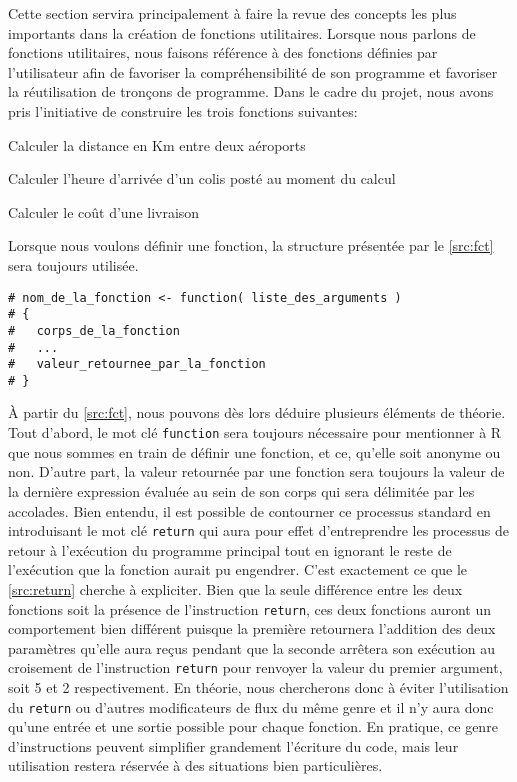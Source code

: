 Cette section servira principalement à faire la revue des concepts les plus importants dans la création de fonctions utilitaires. Lorsque nous parlons de fonctions utilitaires, nous faisons référence à des fonctions définies par l'utilisateur afin de favoriser la compréhensibilité de son programme et favoriser la réutilisation de tronçons de programme. Dans le cadre du projet, nous avons pris l'initiative de construire les trois fonctions suivantes: \\
\begin{description}[style=multiline,leftmargin=2.5cm]
	\item[airportsDist] Calculer la distance en Km entre deux aéroports
	\item[arrivalTime] Calculer l'heure d'arrivée d'un colis posté au moment du calcul
	\item[shippingCost] Calculer le coût d'une livraison
\end{description}

Lorsque nous voulons définir une fonction, la structure présentée par le \autoref{src:fct} sera toujours utilisée. 

\begin{lstlisting}[caption = Structure pour la définition d'une fonction,label=src:fct]
# nom_de_la_fonction <- function( liste_des_arguments )
# {
# 	corps_de_la_fonction
# 	... 
# 	valeur_retournee_par_la_fonction
# }
\end{lstlisting}

\vspace{\baselineskip}
À partir du \autoref{src:fct}, nous pouvons dès lors déduire plusieurs éléments de théorie. Tout d'abord, le mot clé \texttt{function} sera toujours nécessaire pour mentionner à R que nous sommes en train de définir une fonction, et ce, qu'elle soit anonyme ou non. D'autre part, la valeur retournée par une fonction sera toujours la valeur de la dernière expression évaluée au sein de son corps qui sera délimitée par les accolades. Bien entendu, il est possible de contourner ce processus standard en introduisant le mot clé \texttt{return} qui aura pour effet d'entreprendre les processus de retour à l'exécution du programme principal tout en ignorant le reste de l'exécution que la fonction aurait pu engendrer. C'est exactement ce que le \autoref{src:return} cherche à expliciter. Bien que la seule différence entre les deux fonctions soit la présence de l'instruction \texttt{return}, ces deux fonctions auront un comportement bien différent puisque la première retournera l'addition des deux paramètres qu'elle aura reçus pendant que la seconde arrêtera son exécution au croisement de l'instruction \texttt{return} pour renvoyer la valeur du premier argument, soit 5 et 2 respectivement. En théorie, nous chercherons donc à éviter l'utilisation du \texttt{return} ou d'autres modificateurs de flux du même genre et il n'y aura donc qu'une entrée et une sortie possible pour chaque fonction. En pratique, ce genre d'instructions peuvent simplifier grandement l'écriture du code, mais leur utilisation restera réservée à des situations bien particulières.

